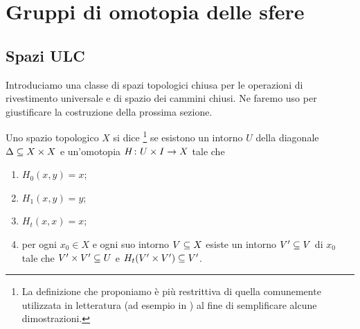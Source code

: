 \chapter{Gruppi di omotopia delle sfere}
\label{ch:homotopy-groups-of-spheres}
\section{Spazi ULC}

Introduciamo una classe di spazi topologici chiusa per le operazioni di rivestimento universale e di spazio dei cammini chiusi. Ne faremo uso per giustificare la costruzione della prossima sezione.

\begin{definition}
Uno spazio topologico \(X\) si dice \footnote{La definizione che proponiamo è più restrittiva di quella comunemente utilizzata in letteratura (ad esempio in ) al fine di semplificare alcune dimostrazioni.} se esistono un intorno \(U\) della diagonale \(\Delta\subseteq X\times X\) e un'omotopia \(\map{H}{U\times I}{X}\) tale che
\begin{enumerate}
\item\label{ULC:pr1} \(H_0(x,y)=x\);
\item\label{ULC:pr2} \(H_1(x,y)=y\);
\item\label{ULC:pr3} \(H_t(x,x)=x\);
\item\label{ULC:pr4} per ogni \(x_0\in X\) e ogni suo intorno \(V\subseteq X\) esiste un intorno \(V'\subseteq V\) di \(x_0\) tale che \(V'\times V'\subseteq U\) e \(H_t(V'\times V')\subseteq V'\).
\end{enumerate}
\end{definition}

